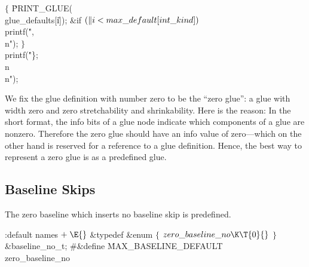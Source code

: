 \1${}\{{}$\5
\.{PRINT\_GLUE}(\\{glue\_defaults}[\|i]);\5
\&{if} ${}(\|i<\index{max default+\\{max\_default}}\\{max\_default}[\index{int kind+\\{int\_kind}}\\{int\_kind}]){}$\1\5
\\{printf}(\.{",\\n"});\2\6
\4${}\}{}$\2\6
\\{printf}(\.{"\};\\n\\n"});
\Y
\fi


We fix the glue definition with number zero to be the ``zero glue'': a
glue with width zero and zero stretchability and shrinkability. Here
is the reason: In the short format, the info bits of a glue node
indicate which components of a glue are nonzero.  Therefore the zero
glue should have an info value of zero---which on the other hand is
reserved for a reference to a glue definition. Hence, the best way to
represent a zero glue is as a predefined glue.


\subsection{Baseline Skips}

The zero baseline which inserts no baseline skip is predefined.

\Y\B\4:default names\X${}\mathrel+\E{}$\6
\&{typedef} \&{enum} ${}\{{}$\1\6
${}\index{zero baseline no+\\{zero\_baseline\_no}}\\{zero\_baseline\_no}\K\T{0}{}$\2\6
${}\}{}$ \&{baseline\_no\_t};\6
\8\#\&{define} \.{MAX\_BASELINE\_DEFAULT}\5\\{zero\_baseline\_no}
\Y
\fi

